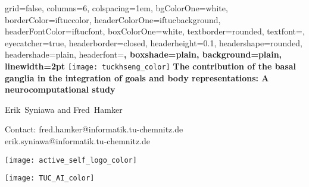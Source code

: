 \documentclass[portrait,final,a0paper,fontscale=0.36]{baposter}
\begin{document}
\begin{poster}%
	{
		grid=false,
		columns=6,
		colspacing=1em,
		bgColorOne=white,
		borderColor=iftuccolor,
		headerColorOne=iftucbackground,
		headerFontColor=iftucfont,
		boxColorOne=white,
		textborder=rounded,
		textfont=\small,
		eyecatcher=true,
		headerborder=closed,
		headerheight=0.1\textheight,
		headershape=rounded,
		headershade=plain,
		headerfont=\Large\bf, %
		boxshade=plain,
		background=plain,
		linewidth=2pt
	}
	{\texttt{[image: tuckhseng\_color]}} 
	{\bf\LARGE{The contribution of the basal ganglia in the integration of goals and  body representations: A neurocomputational study}\vspace{10pt}}
	{\large Erik~Syniawa and Fred~Hamker \\ \vspace{0.5em}
	
	\small \centering Contact: fred.hamker@informatik.tu-chemnitz.de \\ erik.syniawa@informatik.tu-chemnitz.de
	}
	{	
		\begin{minipage}[r]{0.1\textwidth}
			\texttt{[image: active\_self\_logo\_color]}
		\end{minipage}
		\hfill
		\begin{minipage}[r]{0.1\textwidth}
			\texttt{[image: TUC\_AI\_color]}
		\end{minipage}
		
	}

\end{poster}
\end{document}

